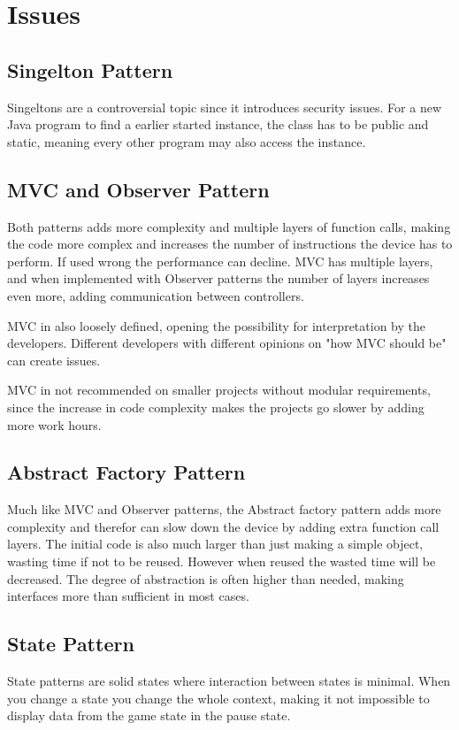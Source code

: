 \chapter{Issues}
\section{Singelton Pattern}
	Singeltons are a controversial topic\cite{singelton-controversial} since it introduces security issues. For a new Java program to find a earlier started instance, the class has to be public and static, meaning every other program may also access the instance. 

\section{MVC and Observer Pattern}
	Both patterns adds more complexity and multiple layers of function calls\cite{pensum}, making the code more complex and increases the number of instructions the device has to perform. If used wrong the performance can decline. MVC has multiple layers, and when implemented with Observer patterns the number of layers increases even more, adding communication between controllers\cite{using_observer}.

	MVC in also loosely defined, opening the possibility for interpretation by the developers. Different developers with different opinions on "how MVC should be" can create issues.

	MVC in not recommended on smaller projects without modular requirements, since the increase in code complexity makes the projects go slower by adding more work hours.

\section{Abstract Factory Pattern}
	Much like MVC and Observer patterns, the Abstract factory pattern adds more complexity\cite{abstractfactory}\cite{abstractfactory_question} and therefor can slow down the device by adding extra function call layers. The initial code is also much larger than just making a simple object, wasting time if not to be reused. However when reused the wasted time will be decreased.
	The degree of abstraction is often higher than needed, making interfaces more than sufficient in most cases.

\section{State Pattern}
	State patterns are solid states where interaction between states is minimal\cite{online:msdn_singleton}. When you change a state you change the whole context, making it not impossible to display data from the game state in the pause state.